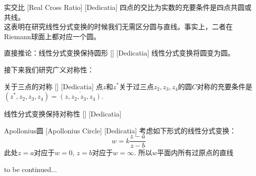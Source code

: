 \documentclass[UTF8]{ctexart}
\newcommand{\continued}{{\Large to be continued...}}
\begin{document}
\begin{ppt}
    [UUID]
    {实交比}
    [Real Cross Ratio]
    [Dedicatia]
    四点的交比为实数的充要条件是四点共圆或共线。\\
    这表明在研究线性分式变换的时候我们无需区分圆与直线。事实上，二者在Riemann球面上都对应一个圆。
\end{ppt}
\begin{ppt}
    [UUID]
    {直接推论：线性分式变换保持圆形}
    []
    [Dedicatia]
    线性分式变换将圆变为圆。
\end{ppt}
接下来我们研究广义对称性：
\begin{ppt}
    [UUID]
    {关于三点的对称}
    []
    [Dedicatia]
    点$z$和$z^*$关于过三点$z_2,z_3,z_4$的圆$C$对称的充要条件是$(z^*,z_2,z_3,z_4)=\overline{(z,z_2,z_3,z_4)}$.
\end{ppt}
\begin{ppt}
    [UUID]
    {线性分式变换保持对称性}
    []
    [Dedicatia]
\end{ppt}
\begin{dfn}
    [UUID]
    {Apollonius圆}
    [Apollonius Circle]
    [Dedicatia]
    考虑如下形式的线性分式变换：
    \[w=k\frac{z-a}{z-b}\]
    此处$z=a$对应于$w=0$, $z=b$对应于$w=\infty$. 所以$w$平面内所有过原点的直线
\end{dfn}
\continued
\end{document}

